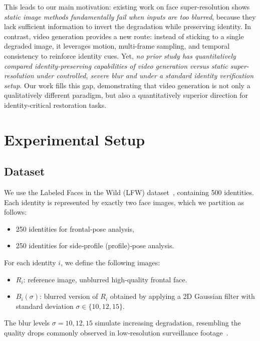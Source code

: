 \documentclass{ieeeaccess}
\begin{document}
This leads to our main motivation: existing work on face super-resolution shows \emph{static image methods fundamentally fail when inputs are too blurred}, because they lack sufficient information to invert the degradation while preserving identity. In contrast, video generation provides a new route: instead of sticking to a single degraded image, it leverages motion, multi-frame sampling, and temporal consistency to reinforce identity cues. Yet, \emph{no prior study has quantitatively compared identity-preserving capabilities of video generation versus static super-resolution under controlled, severe blur and under a standard identity verification setup}. Our work fills this gap, demonstrating that video generation is not only a qualitatively different paradigm, but also a quantitatively superior direction for identity-critical restoration tasks.

\section{Experimental Setup}
\label{sec:setup}

\subsection{Dataset}
We use the Labeled Faces in the Wild (LFW) dataset~\cite{LFW}, containing 500 identities. Each identity is represented by exactly two face images, which we partition as follows:

\begin{itemize}
    \item 250 identities for frontal‑pose analysis,
    \item 250 identities for side‑profile (profile)‑pose analysis.
\end{itemize}

For each identity $i$, we define the following images:

\begin{itemize}
    \item $R_i$: reference image, unblurred high‑quality frontal face.
    \item $B_i(\sigma)$: blurred version of $R_i$ obtained by applying a 2D Gaussian filter with standard deviation $\sigma \in \{10, 12, 15\}$.
\end{itemize}

The blur levels $\sigma = 10, 12, 15$ simulate increasing degradation, resembling the quality drops commonly observed in low‑resolution surveillance footage~\cite{SurveyDiffusionISR}.
\end{document}
